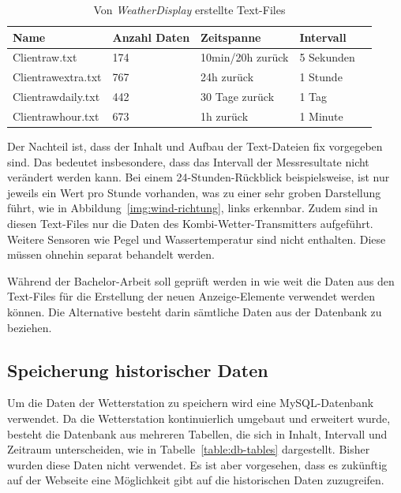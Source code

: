 \begin{table}[h]
\centering
\begin{tabular}{|l|l|l|l|l|}
\hline
 Name			&  Anzahl Daten	& 	Zeitspanne  		& 	Intervall			\\ \hline
 Clientraw.txt 		&  174			&  	10min/20h zurück 	& 	5 Sekunden 		\\ \hline
 Clientrawextra.txt	&  767 			&  	24h zurück 		& 	1 Stunde 			\\ \hline
 Clientrawdaily.txt 	&  442 			&  	30 Tage zurück 	&  	1 Tag 			\\ \hline
 Clientrawhour.txt	&  673			&  	1h zurück 			& 	1 Minute 			\\ \hline
\end{tabular}
\caption{Von \textit{WeatherDisplay} erstellte Text-Files}
\label{table:text-files}
\end{table}

\noindent
Der Nachteil ist, dass der Inhalt und Aufbau der Text-Dateien fix vorgegeben sind. Das bedeutet insbesondere, dass das Intervall der Messresultate nicht verändert werden kann. Bei einem 24-Stunden-Rückblick beispielsweise, ist nur jeweils ein Wert pro Stunde vorhanden, was zu einer sehr groben Darstellung führt, wie in Abbildung~\ref{img:wind-richtung}, links erkennbar. Zudem sind in diesen Text-Files nur die Daten des Kombi-Wetter-Transmitters aufgeführt. Weitere Sensoren wie Pegel und Wassertemperatur sind nicht enthalten. Diese müssen ohnehin separat behandelt werden.
\newline

\noindent
Während der Bachelor-Arbeit soll geprüft werden in wie weit die Daten aus den Text-Files für die Erstellung der neuen Anzeige-Elemente verwendet werden können. Die Alternative besteht darin sämtliche Daten aus der Datenbank zu beziehen.


\subsection{Speicherung historischer Daten}
Um die Daten der Wetterstation zu speichern wird eine MySQL-Datenbank verwendet. Da die Wetterstation kontinuierlich umgebaut und erweitert wurde, besteht die Datenbank aus mehreren Tabellen, die sich in Inhalt, Intervall und Zeitraum unterscheiden, wie in Tabelle~\ref{table:db-tables} dargestellt. Bisher wurden diese Daten nicht verwendet. Es ist aber vorgesehen, dass es zukünftig auf der Webseite eine Möglichkeit gibt auf die historischen Daten zuzugreifen.
\newline

